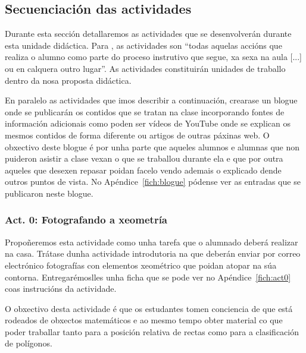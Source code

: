 \subsection{Secuenciación das actividades}

Durante esta sección detallaremos as actividades que se desenvolverán durante esta unidade didáctica. Para , as actividades son ``todas aquelas accións que realiza o alumno como parte do proceso instrutivo que segue, xa sexa na aula [...] ou en calquera outro lugar''. As actividades constituirán unidades de traballo dentro da nosa proposta didáctica.

En paralelo as actividades que imos describir a continuación, crearase un blogue onde se publicarán os contidos que se tratan na clase incorporando fontes de información adicionais como poden ser vídeos de YouTube onde se explican os mesmos contidos de forma diferente ou artigos de outras páxinas web. O obxectivo deste blogue é por unha parte que aqueles alumnos e alumnas que non puideron asistir a clase vexan o que se traballou durante ela e que por outra aqueles que desexen repasar poidan facelo vendo ademais o explicado dende outros puntos de vista. No Apéndice~\ref{fich:blogue} pódense ver as entradas que se publicaron neste blogue.

\subsubsection{Act. 0: Fotografando a xeometría}\label{act:fotografias}
Propoñeremos esta actividade como unha tarefa que o alumnado deberá realizar na casa. Trátase dunha actividade introdutoria na que deberán enviar por correo electrónico fotografías con elementos xeométrico que poidan atopar na súa contorna. Entregarémoslles unha ficha que se pode ver no  Apéndice~\ref{fich:act0} coas instrucións da actividade.

O obxectivo desta actividade é que os estudantes tomen conciencia de que está rodeados de obxectos matemáticos e ao mesmo tempo obter material co que poder traballar tanto para a posición relativa de rectas como para a clasificación de polígonos.

